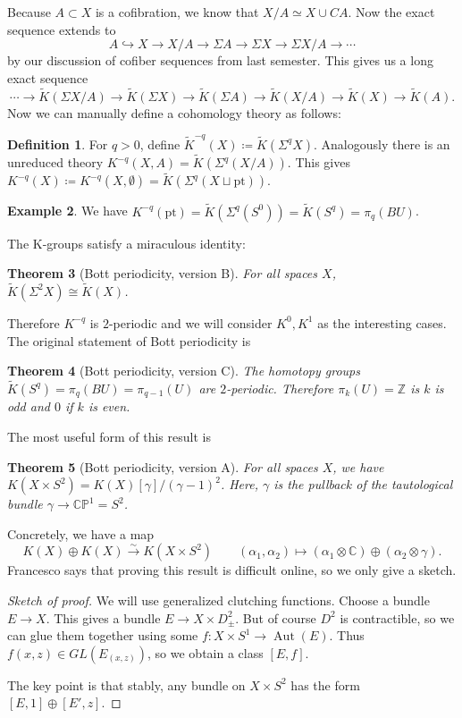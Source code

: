 \documentclass[leqno, openany]{memoir}
\newtheorem{thm}{Theorem}[section]
\theoremstyle{definition}
\newtheorem{defn}[thm]{Definition}
\newtheorem{exm}[thm]{Example}
\theoremstyle{remark}
\theoremstyle{plain}
\theoremstyle{definition}
\theoremstyle{remark}
\newcommand{\C}{\mathbb{C}}
\newcommand{\Z}{\mathbb{Z}}
\renewcommand{\P}{\mathbb{P}}
\newcommand{\mr}[1]{\mathrm{#1}}
\newcommand{\wt}[1]{\widetilde{#1}}
\DeclareMathOperator{\Aut}{Aut}
\begin{document}
Because $A \subset X$ is a cofibration, we know that $X/A \simeq X \cup CA$.
Now the exact sequence extends to \[ A \hookrightarrow X \to X/A \to \Sigma A
\to \Sigma X \to \Sigma X/A \to \cdots \] by our discussion of cofiber
sequences from last semester. This gives us a long exact sequence \[ \cdots \to
\wt{K}(\Sigma X/A) \to \wt{K}(\Sigma X) \to \wt{K}(\Sigma A) \to \wt{K}(X/A)
\to \wt{K}(X) \to \wt{K}(A). \] Now we can manually define a cohomology theory
as follows: \begin{defn} For $q > 0$, define $\wt{K}^{-q}(X) \coloneqq
    \wt{K}(\Sigma^q X)$. Analogously there is an unreduced theory $K^{-q}(X,A)
    = \wt{K}(\Sigma^q(X/A))$. This gives $K^{-q}(X) \coloneqq K^{-q}(X,
    \emptyset) = \wt{K}(\Sigma^q(X \sqcup \mr{pt}))$.  \end{defn}

\begin{exm} We have $K^{-q}(\mr{pt}) = \wt{K}(\Sigma^q(S^0)) = \wt{K}(S^q) =
\pi_q(BU)$.  \end{exm}

The K-groups satisfy a miraculous identity: \begin{thm}[Bott periodicity,
version B] For all spaces $X$, $\wt{K}(\Sigma^2 X) \cong \wt{K}(X)$.  \end{thm}
Therefore $K^{-q}$ is $2$-periodic and we will consider $K^0, K^1$ as the
interesting cases. The original statement of Bott periodicity is

\begin{thm}[Bott periodicity, version C] The homotopy groups $\wt{K}(S^q) =
\pi_q(BU) = \pi_{q-1}(U)$ are $2$-periodic. Therefore $\pi_k(U) = \Z$ is $k$ is
odd and $0$ if $k$ is even.  \end{thm}

The most useful form of this result is \begin{thm}[Bott periodicity, version A]
    For all spaces $X$, we have $K(X \times S^2) =
    K(X)[\gamma]/{(\gamma-1)}^2$. Here, $\gamma$ is the pullback of the
    tautological bundle $\gamma \to \C\P^1 = S^2$.  \end{thm}

Concretely, we have a map \[ K(X) \oplus K(X) \xrightarrow{\sim} K(X \times
S^2) \qquad (\alpha_1, \alpha_2) \mapsto (\alpha_1 \otimes \C) \oplus (\alpha_2
\otimes \gamma). \] Francesco says that proving this result is difficult
online, so we only give a sketch.

\begin{proof}[Sketch of proof] We will use generalized clutching functions.
    Choose a bundle $E \to X$. This gives a bundle $E \to X \times D^2_{\pm}$.
    But of course $D^2$ is contractible, so we can glue them together using
    some $f \colon X \times S^1 \to \Aut(E)$. Thus $f(x,z) \in GL(E_{(x,z)})$,
    so we obtain a class $[E, f]$.

    The key point is that stably, any bundle on $X \times S^2$ has the form
$[E,1] \oplus [E', z]$.  \end{proof}
\end{document}

